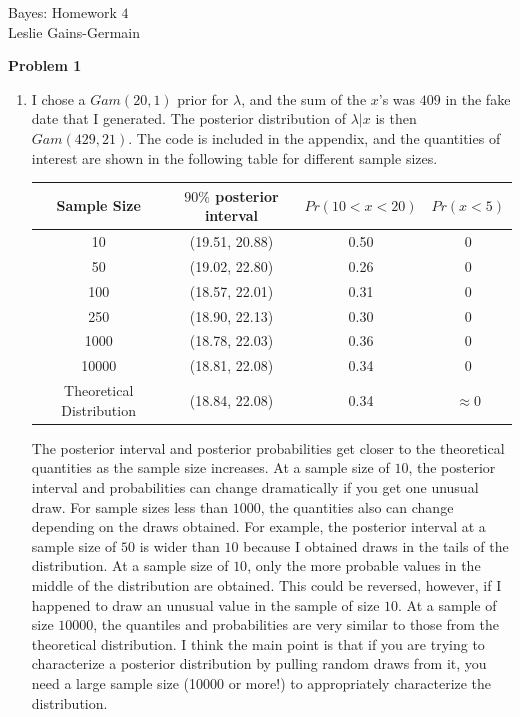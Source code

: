 \documentclass[12pt]{article}\usepackage[]{graphicx}\usepackage[]{color}
\begin{document}
  
  
\begin{center}
\large{Bayes: Homework $4$} \\
Leslie Gains-Germain
\end{center}

\begin{doublespacing}

{\bf Problem 1}

\begin{enumerate}

\item I chose a $Gam(20, 1)$ prior for $\lambda$, and the sum of the $x$'s was $409$ in the fake date that I generated. The posterior distribution of $\lambda|x$ is then $Gam(429, 21)$. The code is included in the appendix, and the quantities of interest are shown in the following table for different sample sizes.

\begin{table} [h!]
\centering
\begin{tabular} {c|c|c|c}
Sample Size & $90\%$ posterior interval & $Pr(10 < x < 20)$ & $Pr(x < 5)$ \\
\hline 
10 & (19.51, 20.88) & 0.50 & 0 \\
50 & (19.02, 22.80) & 0.26 & 0 \\
100 & (18.57, 22.01) & 0.31 & 0 \\
250 & (18.90, 22.13) & 0.30 & 0 \\
1000 & (18.78, 22.03) & 0.36 & 0 \\
10000 & (18.81, 22.08) & 0.34 & 0 \\
Theoretical Distribution & (18.84, 22.08) & 0.34 & $\approx 0$ \\
\hline
\end{tabular}
\end{table}

The posterior interval and posterior probabilities get closer to the theoretical quantities as the sample size increases. At a sample size of $10$, the posterior interval and probabilities can change dramatically if you get one unusual draw. For sample sizes less than $1000$, the quantities also can change depending on the draws obtained. For example, the posterior interval at a sample size of $50$ is wider than $10$ because I obtained draws in the tails of the distribution. At a sample size of $10$, only the more probable values in the middle of the distribution are obtained. This could be reversed, however, if I happened to draw an unusual value in the sample of size $10$. At a sample of size $10000$, the quantiles and probabilities are very similar to those from the theoretical distribution. I think the main point is that if you are trying to characterize a posterior distribution by pulling random draws from it, you need a large sample size (10000 or more!) to appropriately characterize the distribution.





\end{enumerate}
\end{doublespacing}
\end{document}
